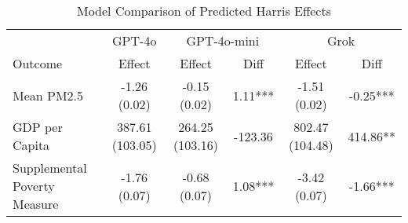 \begin{table}[htbp]
    \centering
    \begin{tabular}{lccccc}
    \hline
    & \multicolumn{1}{c}{GPT-4o} & \multicolumn{2}{c}{GPT-4o-mini} & \multicolumn{2}{c}{Grok} \\
    Outcome & Effect & Effect & Diff & Effect & Diff \\
    \hline
    Mean PM2.5 & -1.26 (0.02) & -0.15 (0.02) & 1.11*** & -1.51 (0.02) & -0.25*** \\
    GDP per Capita & 387.61 (103.05) & 264.25 (103.16) & -123.36 & 802.47 (104.48) & 414.86** \\
    Supplemental Poverty Measure & -1.76 (0.07) & -0.68 (0.07) & 1.08*** & -3.42 (0.07) & -1.66*** \\
    \hline
    \end{tabular}
    \caption{Model Comparison of Predicted Harris Effects}
\end{table}
